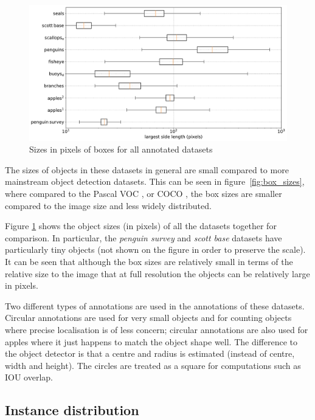 \begin{figure}[ht]
\centering
\includegraphics[width=1.0\linewidth]{charts/summaries/sizes_boxplot.pdf}
\caption{ Sizes in pixels of boxes for all annotated datasets }
\label{fig:box_sizes_plot}
\end{figure}

The sizes of objects in these datasets in general are small compared to more mainstream object detection datasets. This can be seen in figure~\ref{fig:box_sizes}, where compared to the Pascal VOC \cite{Everingham2008}, or COCO \cite{Lin2014}, the box sizes are smaller compared to the image size and less widely distributed. 

Figure \ref{fig:box_sizes_plot}  shows the object sizes (in pixels) of all the datasets together for comparison. In particular, the \emph{penguin survey} and \emph{scott base} datasets have particularly tiny objects (not shown on the figure in order to preserve the scale). It can be seen that although the box sizes are relatively small in terms of the relative size to the image that at full resolution the objects can be relatively large in pixels.

Two different types of annotations are used in the annotations of these datasets. Circular annotations are used for very small objects and for counting objects where precise localisation is of less concern; circular annotations are also used for apples where it just happens to match the object shape well. The difference to the object detector is that a centre and radius is estimated (instead of centre, width and height). The circles are treated as a square for computations such as \gls{IOU} overlap.

\subsection {Instance distribution}

